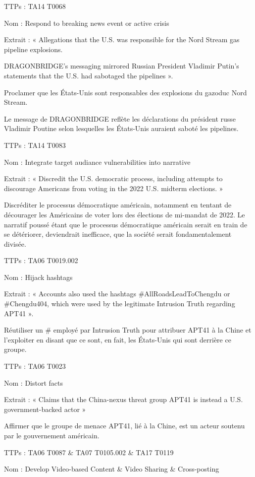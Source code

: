 TTPs : TA14 T0068

Nom : Respond to breaking news event or active crisis

Extrait : « Allegations that the U.S. was responsible for the Nord Stream gas pipeline explosions.

DRAGONBRIDGE’s messaging mirrored Russian President Vladimir Putin’s statements that the U.S. had sabotaged the pipelines ».

Proclamer que les États-Unis sont responsables des explosions du gazoduc Nord Stream.

Le message de DRAGONBRIDGE reflète les déclarations du président russe Vladimir Poutine selon lesquelles les États-Unis auraient saboté les pipelines.

TTPs : TA14 T0083  

Nom : Integrate target audiance vulnerabilities into narrative

Extrait : « Discredit the U.S. democratic process, including attempts to discourage Americans from voting in the 2022 U.S. midterm elections. »

Discréditer le processus démocratique américain, notamment en tentant de décourager les Américains de voter lors des élections de mi-mandat de 2022. Le narratif poussé étant que le processus démocratique américain serait en train de se détériorer, deviendrait inefficace, que la société serait fondamentalement divisée.  

TTPs : TA06 T0019.002

Nom : Hijack hashtags

Extrait : « Accounts also used the hashtags #AllRoadsLeadToChengdu or #Chengdu404, which were used by the legitimate Intrusion Truth regarding APT41 ».

Réutiliser un # employé par Intrusion Truth pour attribuer APT41 à la Chine et l’exploiter en disant que ce sont, en fait, les États-Unis qui sont derrière ce groupe.

TTPs : TA06 T0023

Nom : Distort facts	

Extrait : « Claims that the China-nexus threat group APT41 is instead a U.S. government-backed actor »

Affirmer que le groupe de menace APT41, lié à la Chine, est un acteur soutenu par le gouvernement américain.	

TTPs : TA06 T0087 & TA07 T0105.002 & TA17 T0119

Nom : Develop Video-based Content & Video Sharing & Cross-posting

